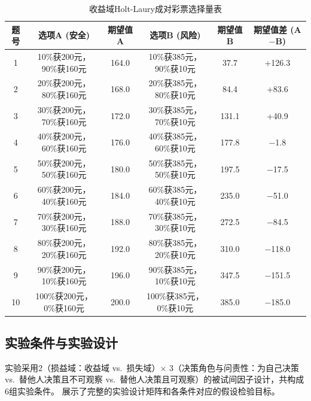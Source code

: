 \documentclass[journal]{vgtc}
\begin{document}
\begin{table}[tb]
  \caption{收益域Holt-Laury成对彩票选择量表}
  \label{tab:hl_gain}
  \centering
  \footnotesize
  \setlength{\tabcolsep}{8pt}
  \begin{tabular}{cccccc}
    \toprule
    题号 & 选项A (安全) & 期望值 A & 选项B (风险) & 期望值 B & 期望值差 (A$-$B) \\
    \midrule
    1 & 10\%获200元，90\%获160元 & 164.0 & 10\%获385元，90\%获10元 & 37.7 & +126.3 \\
    2 & 20\%获200元，80\%获160元 & 168.0 & 20\%获385元，80\%获10元 & 84.4 & +83.6 \\
    3 & 30\%获200元，70\%获160元 & 172.0 & 30\%获385元，70\%获10元 & 131.1 & +40.9 \\
    4 & 40\%获200元，60\%获160元 & 176.0 & 40\%获385元，60\%获10元 & 177.8 & $-$1.8 \\
    5 & 50\%获200元，50\%获160元 & 180.0 & 50\%获385元，50\%获10元 & 197.5 & $-$17.5 \\
    6 & 60\%获200元，40\%获160元 & 184.0 & 60\%获385元，40\%获10元 & 235.0 & $-$51.0 \\
    7 & 70\%获200元，30\%获160元 & 188.0 & 70\%获385元，30\%获10元 & 272.5 & $-$84.5 \\
    8 & 80\%获200元，20\%获160元 & 192.0 & 80\%获385元，20\%获10元 & 310.0 & $-$118.0 \\
    9 & 90\%获200元，10\%获160元 & 196.0 & 90\%获385元，10\%获10元 & 347.5 & $-$151.5 \\
    10 & 100\%获200元，0\%获160元 & 200.0 & 100\%获385元，0\%获10元 & 385.0 & $-$185.0 \\
    \bottomrule
  \end{tabular}
\end{table}

\subsection{实验条件与实验设计}

实验采用2（损益域：收益域 vs.\ 损失域）$\times$ 3（决策角色与问责性：为自己决策 vs.\ 替他人决策且不可观察 vs.\ 替他人决策且可观察）的被试间因子设计，共构成6组实验条件。
展示了完整的实验设计矩阵和各条件对应的假设检验目标。
\end{document}
